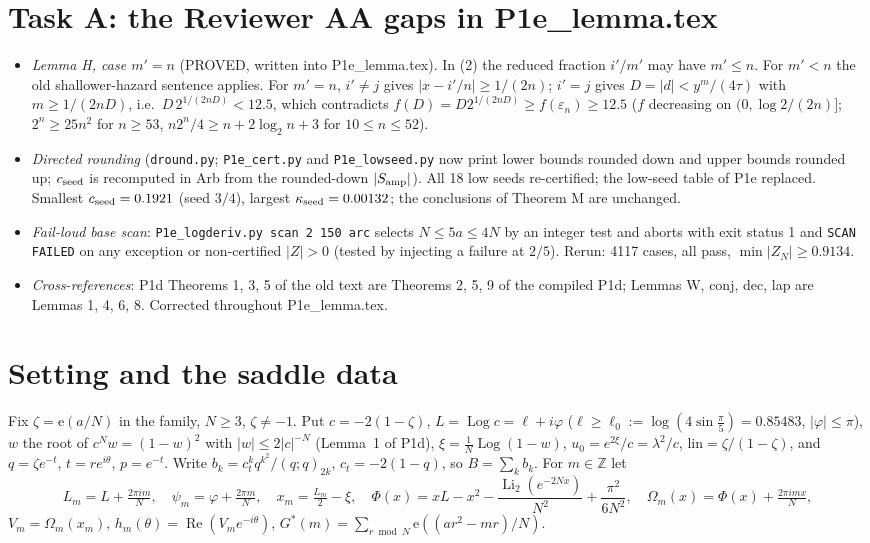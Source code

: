 \documentclass[11pt]{article}
\theoremstyle{definition}\newtheorem{definition}[theorem]{Definition}
\theoremstyle{remark}\newtheorem{remark}[theorem]{Remark}
\newcommand{\e}{\mathrm{e}}
\newcommand{\Li}{\operatorname{Li}_2}
\begin{document}
\section{Task A: the Reviewer AA gaps in P1e\_lemma.tex}\label{sec:A}
\begin{itemize}
\item \emph{Lemma H, case $m'=n$} (PROVED, written into P1e\_lemma.tex). In (2) the reduced fraction $i'/m'$ may have $m'\le n$. For $m'<n$ the old shallower-hazard sentence applies. For $m'=n$, $i'\ne j$ gives $|x-i'/n|\ge1/(2n)$; $i'=j$ gives $D=|d|<y^m/(4\tau)$ with $m\ge1/(2nD)$, i.e.\ $D\,2^{1/(2nD)}<12.5$, which contradicts $f(D)=D2^{1/(2nD)}\ge f(\varepsilon_n)\ge12.5$ ($f$ decreasing on $(0,\log2/(2n)]$; $2^n\ge25n^2$ for $n\ge53$, $n2^n/4\ge n+2\log_2n+3$ for $10\le n\le52$).
\item \emph{Directed rounding} (\texttt{dround.py}; \texttt{P1e\_cert.py} and \texttt{P1e\_lowseed.py} now print lower bounds rounded down and upper bounds rounded up; $c_{\rm seed}$ is recomputed in Arb from the rounded-down $|S_{\rm amp}|$). All 18 low seeds re-certified; the low-seed table of P1e replaced. Smallest $c_{\rm seed}=0.1921$ (seed $3/4$), largest $\kappa_{\rm seed}=0.00132$; the conclusions of Theorem M are unchanged.
\item \emph{Fail-loud base scan}: \texttt{P1e\_logderiv.py scan 2 150 arc} selects $N\le5a\le4N$ by an integer test and aborts with exit status 1 and \texttt{SCAN FAILED} on any exception or non-certified $|Z|>0$ (tested by injecting a failure at $2/5$). Rerun: 4117 cases, all pass, $\min|Z_N|\ge0.9134$.
\item \emph{Cross-references}: P1d Theorems 1, 3, 5 of the old text are Theorems 2, 5, 9 of the compiled P1d; Lemmas W, conj, dec, lap are Lemmas 1, 4, 6, 8. Corrected throughout P1e\_lemma.tex.
\end{itemize}

\section{Setting and the saddle data}\label{sec:set}
Fix $\zeta=\e(a/N)$ in the family, $N\ge3$, $\zeta\ne-1$. Put $c=-2(1-\zeta)$, $L=\operatorname{Log}c=\ell+i\varphi$ ($\ell\ge\ell_0:=\log(4\sin\frac\pi5)=0.85483$, $|\varphi|\le\pi$), $w$ the root of $c^Nw=(1-w)^2$ with $|w|\le2|c|^{-N}$ (Lemma~1 of P1d), $\xi=\frac1N\operatorname{Log}(1-w)$, $u_0=e^{2\xi}/c=\lambda^2/c$, $\mathrm{lin}=\zeta/(1-\zeta)$, and $q=\zeta e^{-t}$, $t=re^{i\theta}$, $p=e^{-t}$. Write $b_k=c_t^kq^{k^2}/(q;q)_{2k}$, $c_t=-2(1-q)$, so $B=\sum_kb_k$.
For $m\in\mathbb Z$ let
\[L_m=L+\tfrac{2\pi im}N,\quad \psi_m=\varphi+\tfrac{2\pi m}N,\quad x_m=\tfrac{L_m}2-\xi,\quad
\Phi(x)=xL-x^2-\frac{\Li(e^{-2Nx})}{N^2}+\frac{\pi^2}{6N^2},\quad \Omega_m(x)=\Phi(x)+\tfrac{2\pi imx}N,\]
$V_m=\Omega_m(x_m)$, $h_m(\theta)=\operatorname{Re}(V_me^{-i\theta})$, $G^*(m)=\sum_{r\bmod N}\e((ar^2-mr)/N)$.
\end{document}

